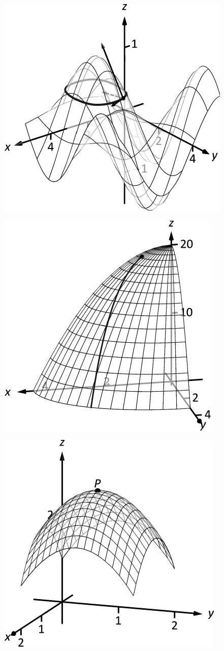 \documentclass[10pt]{article}
\begin{document}
\includegraphics{figdirect2_3DBW.pdf}
\texttt{}

\includegraphics{figdirect3_3DBW.pdf}
\texttt{}

\includegraphics{figdirect9_3DBW.pdf}
\texttt{}
\end{document}
